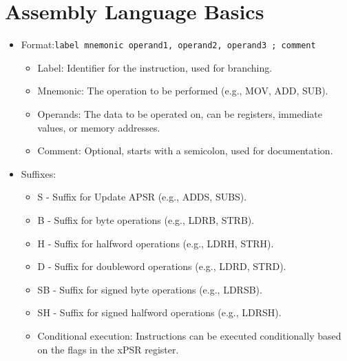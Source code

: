 \documentclass[a4paper,12pt,openany]{book}
\begin{document}
\section{Assembly Language Basics}
\begin{itemize}
    \item Format:\texttt{label mnemonic operand1, operand2, operand3 ; comment}
    \begin{itemize}
        \item Label: Identifier for the instruction, used for branching.
        \item Mnemonic: The operation to be performed (e.g., MOV, ADD, SUB).
        \item Operands: The data to be operated on, can be registers, immediate values, or memory addresses.
        \item Comment: Optional, starts with a semicolon, used for documentation.
    \end{itemize}
    \item Suffixes:
    \begin{itemize}
        \item S - Suffix for Update APSR (e.g., ADDS, SUBS).
        \item B - Suffix for byte operations (e.g., LDRB, STRB).
        \item H - Suffix for halfword operations (e.g., LDRH, STRH).
        \item D - Suffix for doubleword operations (e.g., LDRD, STRD).
        \item SB - Suffix for signed byte operations (e.g., LDRSB).
        \item SH - Suffix for signed halfword operations (e.g., LDRSH).
        \item Conditional execution: Instructions can be executed conditionally based on the flags in the xPSR register.
    \end{itemize}
\end{itemize}
\end{document}
